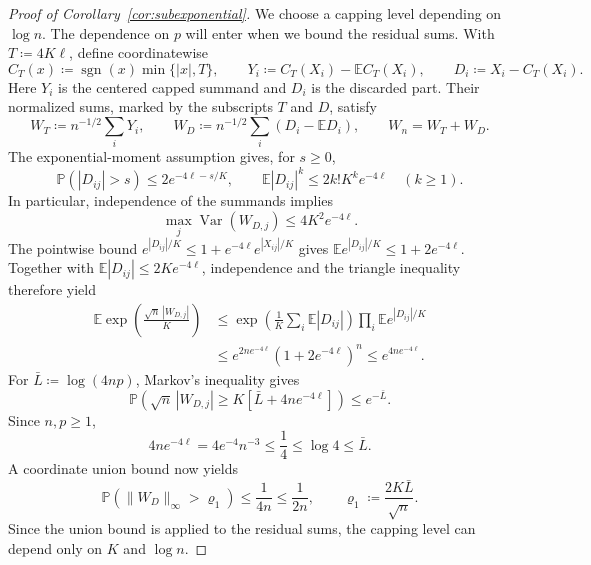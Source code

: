 \documentclass[11pt,letterpaper]{article}
\newcommand{\vSix}[1]{{\color{magenta}#1}}
\theoremstyle{remark}
\newcommand{\E}{\mathbb E}
\newcommand{\Pp}{\mathbb P}
\newcommand{\Var}{\operatorname{Var}}
\begin{document}
\begin{proof}[Proof of Corollary~\ref{cor:subexponential}]
We choose a \vSix{capping} level depending on \(\log n\). The dependence
on \(p\) will enter when we bound the residual sums. With \(T\coloneqq4K\ell\), define coordinatewise
\[
 C_T(x)\coloneqq \operatorname{sgn}(x)\min\{|x|,T\},\qquad
 Y_i\coloneqq C_T(X_i)-\E C_T(X_i),\qquad D_i\coloneqq X_i-C_T(X_i).
\]
Here \(Y_i\) is the centered \vSix{capped} summand and \(D_i\) is the discarded
part. Their normalized sums, marked by the subscripts \(T\) and \(D\), satisfy
\[
 W_T\coloneqq n^{-1/2}\sum_iY_i,\qquad
 W_D\coloneqq n^{-1/2}\sum_i(D_i-\E D_i),\qquad W_n=W_T+W_D.
\]
The exponential-moment assumption gives, for \(s\ge0\),
\[
 \Pp(|D_{ij}|>s)\le2e^{-4\ell-s/K},\qquad
 \E|D_{ij}|^k\le2k!K^ke^{-4\ell}\quad(k\ge1).
\]
In particular, independence of the summands implies
\begin{equation}
 \max_j\Var(W_{D,j})\le4K^2e^{-4\ell}.
 \label{tail:residual-moments}
\end{equation}
The pointwise bound \(e^{|D_{ij}|/K}\le1+e^{-4\ell}e^{|X_{ij}|/K}\)
gives \(\E e^{|D_{ij}|/K}\le1+2e^{-4\ell}\). Together with
\(\E|D_{ij}|\le2Ke^{-4\ell}\), independence and the triangle inequality
therefore yield
\begin{align*}
 \E\exp\!\left(\frac{\sqrt n\,|W_{D,j}|}{K}\right)
 &\le\exp\!\left(\frac1K\sum_i\E|D_{ij}|\right)
          \prod_i\E e^{|D_{ij}|/K}\\
 &\le e^{2ne^{-4\ell}}(1+2e^{-4\ell})^n
 \le e^{4ne^{-4\ell}}.
\end{align*}
For \(\bar L\coloneqq \log(4np)\), Markov's inequality gives
\[
 \Pp\!\left(\sqrt n\,|W_{D,j}|\ge K[\bar L+4ne^{-4\ell}]\right)\le e^{-\bar L}.
\]
Since \(n,p\ge1\),
\[
 4ne^{-4\ell}=4e^{-4}n^{-3}\le\frac14\le\log4\le \bar L.
\]
A coordinate union bound now yields
\begin{equation}
 \Pp(\|W_D\|_\infty>\varrho_1)\le\frac1{4n}\le\frac1{2n},\qquad
 \varrho_1\coloneqq \frac{2K\bar L}{\sqrt n}.
 \label{tail:sum-coupling}
\end{equation}
Since the union bound is applied to the residual sums, the \vSix{capping}
level can depend only on \(K\) and \(\log n\).


\end{proof}
\end{document}
